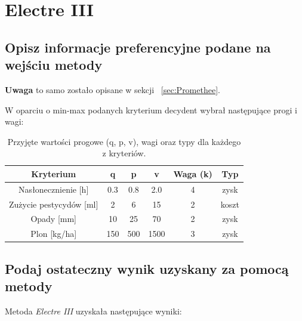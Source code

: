\documentclass[11pt]{article}
\begin{document}
\section{Electre III}
\subsection{Opisz informacje preferencyjne podane na wejściu metody}
\textbf{Uwaga} to samo zostało opisane w sekcji ~\ref{sec:Promethee}.

W oparciu o min-max podanych kryterium decydent wybrał następujące progi i wagi:
\begin{table}[H]
\centering
\begin{tabular}{|c||c|c|c|c|c|}
\hline
\textbf{Kryterium} & \textbf{q} & \textbf{p} & \textbf{v} & \textbf{Waga (k)} & \textbf{Typ} \\
\hline
Nasłonecznienie [h]            & 0.3   & 0.8   & 2.0   & 4 & zysk \\ \hline
Zużycie pestycydów [ml]        & 2     & 6     & 15    & 2 & koszt \\ \hline
Opady [mm]                     & 10    & 25    & 70    & 2 & zysk \\ \hline
Plon [kg/ha]                   & 150   & 500   & 1500  & 3 & zysk \\
\hline
\end{tabular}
\caption{Przyjęte wartości progowe (q, p, v), wagi oraz typy dla każdego z kryteriów.}
\end{table}

\subsection{Podaj ostateczny wynik uzyskany za pomocą metody}
Metoda \textit{Electre III} uzyskała następujące wyniki:
\end{document}
